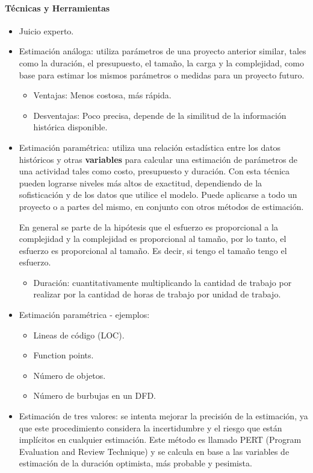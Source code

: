 \documentclass[a4paper,twosides]{article}
\newlength{\wideitemsep}
\let\olditem\item
\renewcommand{\item}{\setlength{\itemsep}{\wideitemsep}\olditem}
\begin{document}
\paragraph{Técnicas y Herramientas}
\begin{itemize}
\item Juicio experto.
\item Estimación análoga: utiliza parámetros de una proyecto anterior similar, tales como la duración, el presupuesto, el tamaño, la carga y la complejidad, como base para estimar los mismos parámetros o medidas para un proyecto futuro.
\begin{itemize}
\item Ventajas: Menos costosa, más rápida.
\item Desventajas: Poco precisa, depende de la similitud de la información histórica disponible.
\end{itemize}
\item Estimación paramétrica: utiliza una relación estadística entre los datos históricos y otras \textbf{variables} para calcular una estimación de parámetros de una actividad tales como costo, presupuesto y duración. Con esta técnica pueden lograrse niveles más altos de exactitud, dependiendo de la sofisticación y de los datos que utilice el modelo. Puede aplicarse a todo un proyecto o a partes del mismo, en conjunto con otros métodos de estimación.
\par En general se parte de la hipótesis que el esfuerzo es proporcional a la complejidad y la complejidad es proporcional al tamaño, por lo tanto, el esfuerzo es proporcional al tamaño. Es decir, si tengo el tamaño tengo el esfuerzo.
\begin{itemize}
\item Duración: cuantitativamente multiplicando la cantidad de trabajo por realizar por la cantidad de horas de trabajo por unidad de trabajo.
\end{itemize}
\item Estimación paramétrica - ejemplos:
\begin{itemize}
\item Lineas de código (LOC).
\item Function points.
\item Número de objetos.
\item Número de burbujas en un DFD.
\end{itemize}
\item Estimación de tres valores: se intenta mejorar la precisión de la estimación, ya que este procedimiento considera la incertidumbre y el riesgo que están implícitos en cualquier estimación. Este método es llamado PERT (Program Evaluation and Review Technique) y se calcula en base a las variables de estimación de la duración optimista, más probable y pesimista.

\end{itemize}
\end{document}

